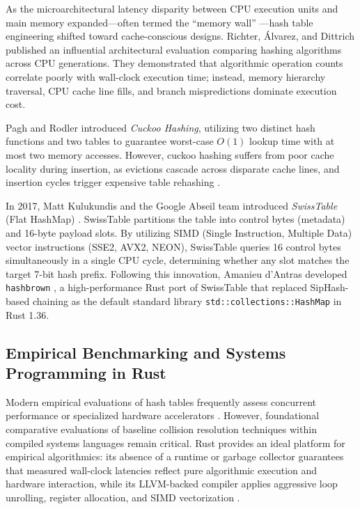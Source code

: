 \documentclass[conference]{IEEEtran}
\begin{document}
As the microarchitectural latency disparity between CPU execution units and main memory expanded---often termed the ``memory wall'' \cite{vitter2001}---hash table engineering shifted toward cache-conscious designs. Richter, \'{A}lvarez, and Dittrich \cite{richter2015} published an influential architectural evaluation comparing hashing algorithms across CPU generations. They demonstrated that algorithmic operation counts correlate poorly with wall-clock execution time; instead, memory hierarchy traversal, CPU cache line fills, and branch mispredictions dominate execution cost.

Pagh and Rodler \cite{pagh2004} introduced \emph{Cuckoo Hashing}, utilizing two distinct hash functions and two tables to guarantee worst-case $O(1)$ lookup time with at most two memory accesses. However, cuckoo hashing suffers from poor cache locality during insertion, as evictions cascade across disparate cache lines, and insertion cycles trigger expensive table rehashing \cite{pagh2007}.

In 2017, Matt Kulukundis and the Google Abseil team introduced \emph{SwissTable} (Flat HashMap) \cite{kulukundis2017, abseil2018}. SwissTable partitions the table into control bytes (metadata) and 16-byte payload slots. By utilizing SIMD (Single Instruction, Multiple Data) vector instructions (SSE2, AVX2, NEON), SwissTable queries 16 control bytes simultaneously in a single CPU cycle, determining whether any slot matches the target 7-bit hash prefix. Following this innovation, Amanieu d'Antras developed \texttt{hashbrown} \cite{antras2018}, a high-performance Rust port of SwissTable that replaced SipHash-based chaining as the default standard library \texttt{std::collections::HashMap} in Rust 1.36.

\subsection{Empirical Benchmarking and Systems Programming in Rust}

Modern empirical evaluations of hash tables frequently assess concurrent performance or specialized hardware accelerators \cite{maier2019, richter2015}. However, foundational comparative evaluations of baseline collision resolution techniques within compiled systems languages remain critical. Rust provides an ideal platform for empirical algorithmics: its absence of a runtime or garbage collector guarantees that measured wall-clock latencies reflect pure algorithmic execution and hardware interaction, while its LLVM-backed compiler applies aggressive loop unrolling, register allocation, and SIMD vectorization \cite{antras2018}.
\end{document}
